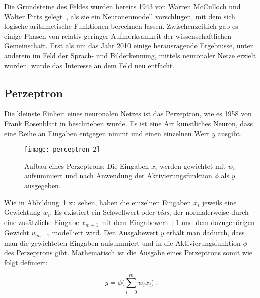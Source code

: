 Die Grundsteine des Feldes wurden bereits 1943 von Warren McCulloch und Walter Pitts gelegt~\cite{mcculloch1943logical}, 
als sie ein Neuronenmodell vorschlugen, mit dem sich logische arithmetische Funktionen berechnen lassen. 
Zwischenzeitlich gab es einige Phasen von relativ geringer Aufmerksamkeit der wissenschaftlichen Gemeinschaft. 
Erst als um das Jahr 2010 einige herausragende Ergebnisse, unter anderem im Feld der Sprach- und Bilderkennung, 
mittels neuronaler Netze erzielt wurden, wurde das Interesse an dem Feld neu entfacht. 



\subsection{Perzeptron}
Die kleinste Einheit eines neuronalen Netzes ist das Perzeptron, wie es 1958 von Frank Rosenblatt in \cite{rosenblatt1958perceptron} beschrieben wurde.
Es ist eine Art künstliches Neuron, dass eine Reihe an Eingaben entgegen nimmt und einen einzelnen Wert \(y\) ausgibt.

\begin{figure}[h]
    \centering
	\texttt{[image: perceptron-2]}
	\caption[Schematischer Aufbau eines Perzeptrons]{Aufbau eines Perzeptrons: Die Eingaben $x_i$ werden gewichtet mit $w_i$ aufsummiert und nach Anwendung der Aktivierungsfunktion $\phi$ als $y$ ausgegeben.}
	\label{fig:singleNeuron}
\end{figure}

Wie in Abbildung~\ref{fig:singleNeuron} zu sehen, haben die einzelnen Eingaben \(x_i\) jeweils eine Gewichtung \(w_i\).
Es existiert ein Schwellwert oder \textit{bias}, der normalerweise 
durch eine zusätzliche Eingabe \(x_{m+1}\) mit dem Eingabewert \(+1\) und dem dazugehörigen Gewicht \(w_{m+1}\) modelliert wird.
Den Ausgabewert \(y\) erhält man dadurch, dass man die gewichteten Eingaben aufsummiert und in die Aktivierungsfunktion \( \phi \) des Perzeptrons gibt.
Mathematisch ist die Ausgabe eines Perzeptrons somit wie folgt definiert:

\begin{equation}
	y = \phi \Big( \sum_{i= 0}^{m} w_i x_i \Big) \, .
\end{equation}


